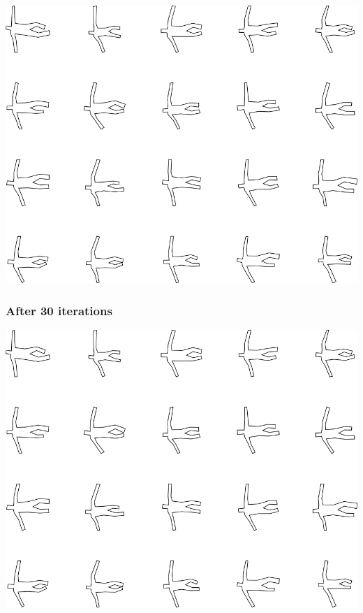 \includegraphics[width=6in]{output/3.learning/simple_tuning/simple_tuning_iter20_.png}
\subsubsection{After 30 iterations}

\includegraphics[width=6in]{output/3.learning/simple_tuning/simple_tuning_iter30_.png}
